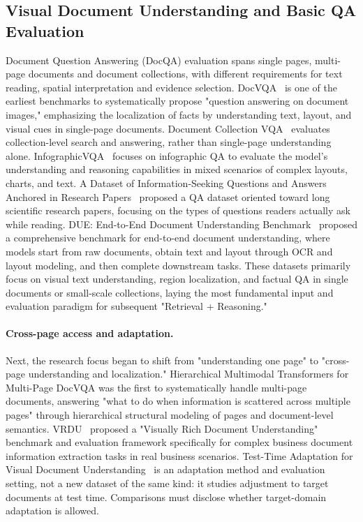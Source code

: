 \subsection{Visual Document Understanding and Basic QA Evaluation}

Document Question Answering (DocQA) evaluation spans single pages, multi-page documents and document collections, with different requirements for text reading, spatial interpretation and evidence selection. DocVQA~\cite{docvqa2020} is one of the earliest benchmarks to systematically propose "question answering on document images," emphasizing the localization of facts by understanding text, layout, and visual cues in single-page documents. Document Collection VQA~\cite{doccollectionvqa2021} evaluates collection-level search and answering, rather than single-page understanding alone. InfographicVQA~\cite{infographicvqa2021} focuses on infographic QA to evaluate the model's understanding and reasoning capabilities in mixed scenarios of complex layouts, charts, and text. A Dataset of Information-Seeking Questions and Answers Anchored in Research Papers~\cite{infoseekqa2021} proposed a QA dataset oriented toward long scientific research papers, focusing on the types of questions readers actually ask while reading. DUE: End-to-End Document Understanding Benchmark~\cite{due2021} proposed a comprehensive benchmark for end-to-end document understanding, where models start from raw documents, obtain text and layout through OCR and layout modeling, and then complete downstream tasks. These datasets primarily focus on visual text understanding, region localization, and factual QA in single documents or small-scale collections, laying the most fundamental input and evaluation paradigm for subsequent "Retrieval + Reasoning."

\paragraph{Cross-page access and adaptation.}
Next, the research focus began to shift from "understanding one page" to "cross-page understanding and localization." Hierarchical Multimodal Transformers for Multi-Page DocVQA \cite{tito2023hierarchicalmultimodaltransformersmultipage} was the first to systematically handle multi-page documents, answering "what to do when information is scattered across multiple pages" through hierarchical structural modeling of pages and document-level semantics. VRDU~\cite{vrdu2023} proposed a "Visually Rich Document Understanding" benchmark and evaluation framework specifically for complex business document information extraction tasks in real business scenarios. Test-Time Adaptation for Visual Document Understanding~\cite{tta-vdu2023} is an adaptation method and evaluation setting, not a new dataset of the same kind: it studies adjustment to target documents at test time. Comparisons must disclose whether target-domain adaptation is allowed.

